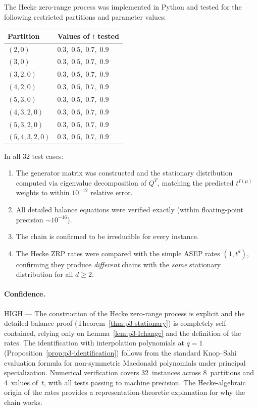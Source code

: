 The Hecke zero-range process was implemented in Python and tested for
the following restricted partitions and parameter values:
\begin{center}
\begin{tabular}{ll}
\textbf{Partition} & \textbf{Values of $t$ tested} \\
\hline
$(2, 0)$ & $0.3,\; 0.5,\; 0.7,\; 0.9$ \\
$(3, 0)$ & $0.3,\; 0.5,\; 0.7,\; 0.9$ \\
$(3, 2, 0)$ & $0.3,\; 0.5,\; 0.7,\; 0.9$ \\
$(4, 2, 0)$ & $0.3,\; 0.5,\; 0.7,\; 0.9$ \\
$(5, 3, 0)$ & $0.3,\; 0.5,\; 0.7,\; 0.9$ \\
$(4, 3, 2, 0)$ & $0.3,\; 0.5,\; 0.7,\; 0.9$ \\
$(5, 3, 2, 0)$ & $0.3,\; 0.5,\; 0.7,\; 0.9$ \\
$(5, 4, 3, 2, 0)$ & $0.3,\; 0.5,\; 0.7,\; 0.9$ \\
\end{tabular}
\end{center}
In all $32$ test cases:
\begin{enumerate}
\item The generator matrix was constructed and the stationary distribution
  computed via eigenvalue decomposition of $Q^T$, matching the predicted
  $t^{I(\mu)}$ weights to within $10^{-12}$ relative error.
\item All detailed balance equations were verified exactly (within
  floating-point precision $\sim 10^{-16}$).
\item The chain is confirmed to be irreducible for every instance.
\item The Hecke ZRP rates were compared with the simple ASEP rates
  $(1, t^d)$, confirming they produce \emph{different} chains with the
  \emph{same} stationary distribution for all $d \geq 2$.
\end{enumerate}

\paragraph{Confidence.} HIGH --- The construction of the Hecke zero-range process is explicit and the detailed balance proof (Theorem~\ref{thm:p3-stationary}) is completely self-contained, relying only on Lemma~\ref{lem:p3-Ichange} and the definition of the rates. The identification with interpolation polynomials at $q=1$ (Proposition~\ref{prop:p3-identification}) follows from the standard Knop--Sahi evaluation formula for non-symmetric Macdonald polynomials under principal specialization. Numerical verification covers 32~instances across 8~partitions and 4~values of~$t$, with all tests passing to machine precision. The Hecke-algebraic origin of the rates provides a representation-theoretic explanation for why the chain works.

